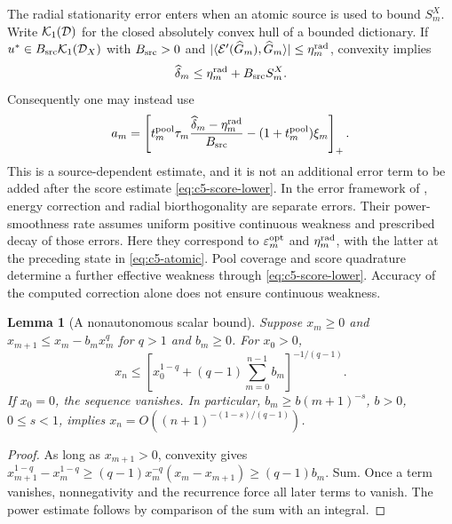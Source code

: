 \documentclass[11pt]{article}
\newtheorem{lemma}[theorem]{Lemma}
\theoremstyle{remark}
\begin{document}
The radial stationarity error enters when an atomic source is used to
bound $S_m^X$. Write $\mathcal K_1(\mathcal D)$ for the closed absolutely convex hull
of a bounded dictionary. If
$u^*\in B_{\rm src}\mathcal K_1(\mathcal D_X)$ with $B_{\rm src}>0$ and
$|\langle\mathcal E'(\widehat G_m),\widehat G_m\rangle|
\leq\eta_m^{\rm rad}$, convexity implies
\begin{equation}
 \widehat\delta_m\leq\eta_m^{\rm rad}+B_{\rm src}S_m^X .
 \label{eq:c5-atomic}
\end{equation}
Consequently one may instead use
\[
 a_m=\left[
 t_m^{\rm pool}\tau_m
       \frac{\widehat\delta_m-\eta_m^{\rm rad}}{B_{\rm src}}
 -(1+t_m^{\rm pool})\xi_m\right]_+ .
\]
This is a source-dependent estimate, and it is not an additional error
term to be added after the score estimate \eqref{eq:c5-score-lower}.
In the error framework of \cite[Section~3, Theorem~3.2 and
Lemma~6.3]{DereventsovTemlyakov2022}, energy correction and radial
biorthogonality are separate errors. Their power-smoothness rate assumes
uniform positive continuous weakness and prescribed decay of those errors.
Here they correspond to $\varepsilon_m^{\rm opt}$ and
$\eta_m^{\rm rad}$, with the latter at the preceding state in
\eqref{eq:c5-atomic}. Pool coverage and score quadrature determine a further
effective weakness through \eqref{eq:c5-score-lower}. Accuracy of the
computed correction alone does not ensure continuous weakness.

\begin{lemma}[A nonautonomous scalar bound]
\label{lem:c5-recurrence}
Suppose $x_m\geq0$ and
$x_{m+1}\leq x_m-b_mx_m^q$ for $q>1$ and $b_m\geq0$.
For $x_0>0$,
\begin{equation}
 x_n\leq\left[x_0^{1-q}+(q-1)\sum_{m=0}^{n-1}b_m\right]^{-1/(q-1)} .
 \label{eq:c5-recurrence}
\end{equation}
If $x_0=0$, the sequence vanishes. In particular,
$b_m\geq b(m+1)^{-s}$, $b>0$, $0\leq s<1$, implies
$x_n=O((n+1)^{-(1-s)/(q-1)})$.
\end{lemma}
\begin{proof}
As long as $x_{m+1}>0$, convexity gives
$x_{m+1}^{1-q}-x_m^{1-q}\geq
(q-1)x_m^{-q}(x_m-x_{m+1})\geq(q-1)b_m$.
Sum. Once a term vanishes, nonnegativity and the recurrence force all
later terms to vanish. The power estimate follows by comparison of the
sum with an integral.
\end{proof}
\end{document}
